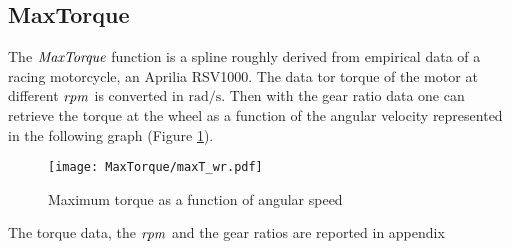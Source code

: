 \subsection{MaxTorque}
\label{subsec:MaxT}
%
The ${\it MaxTorque}$ function is a spline roughly derived from empirical data of a racing motorcycle, an Aprilia RSV1000. The data tor torque of the motor at different $\it rpm$ is converted in $\si{\radian/\second}$. Then with the gear ratio data one can retrieve the torque at the wheel as a function of the angular velocity represented in the following graph (Figure \ref{fig:MaxTorque}).\\
%
\begin{figure}[htb]
    \centering
    \texttt{[image: MaxTorque/maxT\_wr.pdf]}
    \caption{Maximum torque as a function of angular speed}
    \label{fig:MaxTorque}
\end{figure}
%
The torque data, the $\it rpm$ and the gear ratios are reported in appendix 



